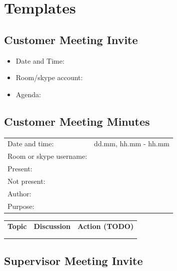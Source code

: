 \chapter{Templates}
\label{chap:templates}

\clearpage

\section{Customer Meeting Invite}

\begin{itemize}
	\item Date and Time:
	\item Room/skype account:
	\item Agenda:
\end{itemize}

\section{Customer Meeting Minutes}

\begin{table}[H]
\begin{tabular}{| p{3cm} | p{9cm} |}
	\hline
	\rowcolor{gray}
	\multicolumn{2}{|c|}{\Large \bf Meeting Minutes - Customer Meeting} \\ \hline
	Date and time: & dd.mm,  hh.mm - hh.mm \\ \hline
	Room or skype username: &  \\ \hline
	Present: &  \\ \hline
	Not present: &  \\ \hline
	Author: &  \\ \hline
	Purpose: &  \\ \hline
\end{tabular}
\end{table}

\begin{table}[H]
\begin{tabular}{| p{} | p{} | p{} |}
	\hline
	\rowcolor{gray}
	\multicolumn{3}{|c|}{\Large \bf Agenda} \\ \hline
	{\bf Topic} & {\bf Discussion} & {\bf Action (TODO)} \\ \hline
	& & \\ \hline
	& & \\ \hline
\end{tabular}
\end{table}

\section{Supervisor Meeting Invite}

